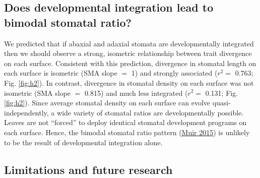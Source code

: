 \documentclass[
  10pt,
]{article}
\begin{document}
\hypertarget{does-developmental-integration-lead-to-bimodal-stomatal-ratio}{%
\subsection{Does developmental integration lead to bimodal stomatal ratio?}\label{does-developmental-integration-lead-to-bimodal-stomatal-ratio}}

We predicted that if abaxial and adaxial stomata are developmentally integrated then we should observe a strong, isometric relationship between trait divergence on each surface. Consistent with this prediction, divergence in stomatal length on each surface is isometric (SMA slope \(=\) 1) and strongly associated (\(r^2 =\) 0.763; Fig. \ref{fig:h2}). In contrast, divergence in stomatal density on each surface was not isometric (SMA slope \(=\) 0.815) and much less integrated (\(r^2 =\) 0.131; Fig. \ref{fig:h2}). Since average stomatal density on each surface can evolve quasi-independently, a wide variety of stomatal ratios are developmentally possible. Leaves are not ``forced'' to deploy identical stomatal development programs on each surface. Hence, the bimodal stomatal ratio pattern (\protect\hyperlink{ref-muir_making_2015}{Muir 2015}) is unlikely to be the result of developmental integration alone.

\hypertarget{limitations-and-future-research}{%
\subsection{Limitations and future research}\label{limitations-and-future-research}}
\end{document}
